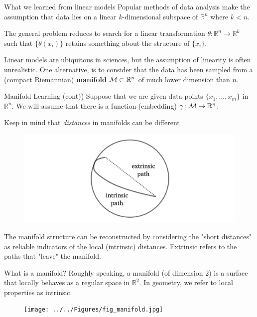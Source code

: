 \documentclass{beamer}
\begin{document}
	
\begin{frame}{What we learned from linear models}
	Popular methods of data analysis make the assumption that  data lies on a linear $k$-dimensional subspace of $\mathbb{R}^n$ where $k< n$. 
	
	The general problem reduces to search for a linear transformation $\theta \colon \mathbb{R}^n \to \mathbb{R}^k$ such that $\{\theta(x_i)\}$ retains something about the structure of $\{x_i\}$. 
	
	Linear models are ubiquitous in sciences, but the assumption of linearity is often unrealistic. One alternative, is to consider that the data has been sampled from a (compact Riemannian) \textbf{manifold} ${\cal M}\subset \mathbb{R}^n$ of much lower dimension than $n$. 

\end{frame}

\begin{frame}{Manifold Learning (cont))}
	Suppose that we are given data points $\{x_1, \ldots, x_m\}$ in $\mathbb{R}^n$. We will assume that there is a function (embedding) $\gamma \colon {\cal M} \to \mathbb{R}^n$. 
	
	Keep in mind that \textit{distances} in manifolds can be different
	\begin{figure}[h]
		\centering
		\includegraphics{../../Figures/fig_manifold_intrinsic.png}
	\end{figure}
	The manifold structure can be reconstructed by considering the "short distances" as reliable indicators of the local (intrinsic) distances. Extrinsic refers to the paths that "leave" the manifold.
	
	
\end{frame}


\begin{frame}{What is a manifold?}
	Roughly speaking, a manifold (of dimension 2) is a surface that locally behaves as a regular space in $\mathbb{R}^2$. In geometry, we refer to local properties as intrinsic. 
\begin{figure}[h]
	\centering
	\texttt{[image: ../../Figures/fig\_manifold.jpg]}
\end{figure}	
		
\end{frame}
\end{document}
